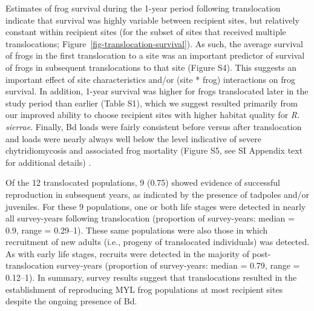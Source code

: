 \documentclass[9pt,twocolumn,twoside,lineno]{pnas-new}
\begin{document}
Estimates of frog survival during the 1-year period following
translocation indicate that survival was highly variable between
recipient sites, but relatively constant within recipient sites (for the
subset of sites that received multiple translocations;
Figure~\ref{fig-translocation-survival}). As such, the average survival
of frogs in the first translocation to a site was an important predictor
of survival of frogs in subsequent translocations to that site
(Figure S4). This suggests an important
effect of site characteristics and/or (site * frog) interactions on frog
survival. In addition, 1-year survival was higher for frogs translocated
later in the study period than earlier
(Table S1), which we suggest resulted
primarily from our improved ability to choose recipient sites with
higher habitat quality for \emph{R. sierrae}. Finally, Bd loads were
fairly consistent before versus after translocation and loads were
nearly always well below the level indicative of severe chytridiomycosis
and associated frog mortality (Figure S5, see
SI Appendix text for additional details)
\citep{joseph2018, vredenburg2010}.

Of the 12 translocated populations, 9 (0.75) showed evidence of
successful reproduction in subsequent years, as indicated by the
presence of tadpoles and/or juveniles. For these 9 populations, one or
both life stages were detected in nearly all survey-years following
translocation (proportion of survey-years: median = 0.9, range =
0.29--1). These same populations were also those in which recruitment of
new adults (i.e., progeny of translocated individuals) was detected. As
with early life stages, recruits were detected in the majority of
post-translocation survey-years (proportion of survey-years: median =
0.79, range = 0.12--1). In summary, survey results suggest that
translocations resulted in the establishment of reproducing MYL frog
populations at most recipient sites despite the ongoing presence of Bd.
\end{document}
